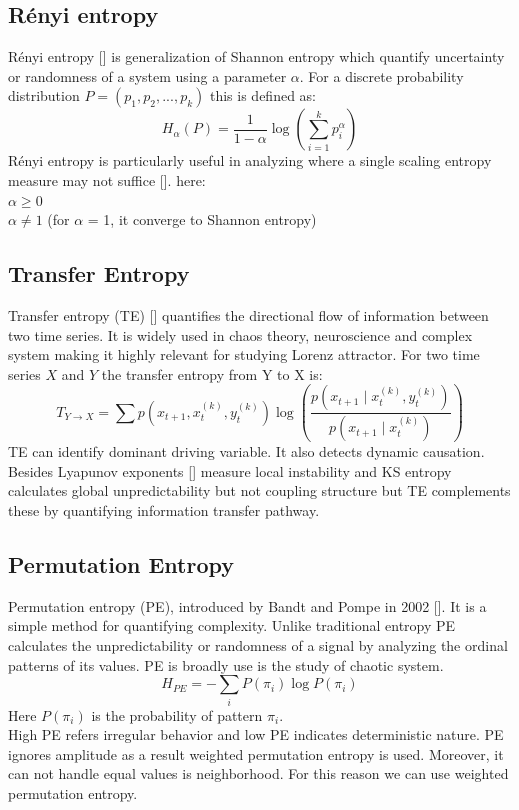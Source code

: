 \documentclass[%
reprint,
amsmath,amssymb,
aps,
floatfix,
]{revtex4-2}
\begin{document}
	\subsection{Rényi entropy}
	Rényi entropy [] is generalization of Shannon entropy which quantify uncertainty or randomness of a system using a parameter $\alpha$. For a discrete probability distribution $P = (p_1,p_2,...,p_k)$ this is defined as:
	\begin{equation}
		H_\alpha (P) = \frac{1}{1 - \alpha} \log (\sum_{i=1}^{k} p_{i}^{\alpha})
	\end{equation}
	R\'enyi entropy is particularly useful in analyzing where a single scaling entropy measure may not suffice []. 
	here:\\
	$\alpha \geq 0$\\ 
	$\alpha \neq 1$ (for $\alpha$ = 1, it converge to Shannon entropy)\\
	\subsection{Transfer Entropy}
	Transfer entropy (TE) [] quantifies the directional flow of information between two time series. It is widely used in chaos theory, neuroscience and complex system making it highly relevant for studying Lorenz attractor. For two time series $X$ and $Y$ the transfer entropy from Y to X is:
	\begin{equation}
		T_{Y\to X} = \sum p(x_{t+1}, x_{t}^{(k)}, y_{t}^{(k)}) \log\left( \frac{p(x_{t+1} \mid x_{t}^{(k)}, y_{t}^{(k)})}{p(x_{t+1} \mid x_{t}^{(k)})} \right)
	\end{equation}
	TE can identify dominant driving variable. It also detects dynamic causation. Besides Lyapunov exponents [] measure local instability and KS entropy calculates global unpredictability but not coupling structure but TE complements these by quantifying information transfer pathway.
	\subsection{Permutation Entropy}
	Permutation entropy (PE), introduced by Bandt and Pompe in 2002 []. It is a simple method for quantifying complexity. Unlike traditional entropy PE calculates the unpredictability or randomness of a signal by analyzing the ordinal patterns of its values. PE is broadly use is the study of chaotic system.
	\begin{equation}
		H_{PE} = -\sum_{i} P(\pi_i) \log P(\pi_i)
	\end{equation}
	Here $P(\pi_i)$ is the probability of pattern $\pi_i$.\\
	High PE refers irregular behavior and low PE indicates deterministic nature. PE ignores amplitude as a result weighted permutation entropy is used. Moreover, it can not handle equal values is neighborhood. For this reason we can use weighted permutation entropy.
\end{document}
